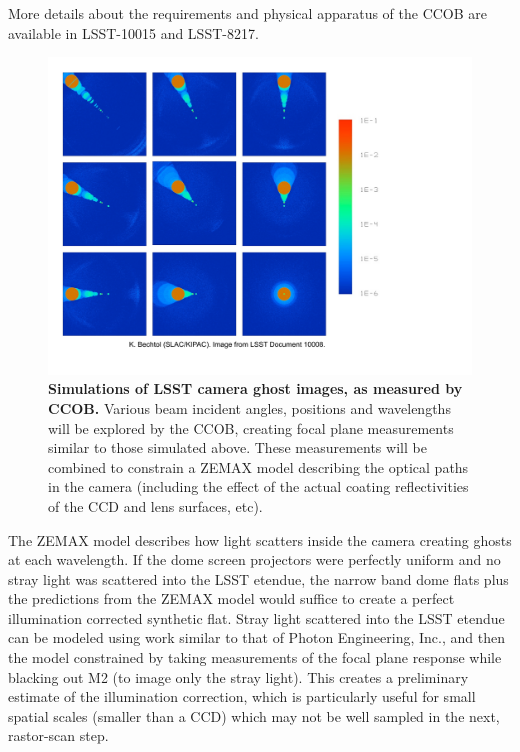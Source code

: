 \documentclass[12pt,preprint]{aastex}
\begin{document}
More details about the requirements and physical apparatus of the CCOB
are available in LSST-10015 and LSST-8217.

\begin{figure}
\centering
\includegraphics[width=5.5in,angle=90]{ghost_images}
\caption{ {\small
{\bf Simulations of LSST camera ghost images, as measured by CCOB. }
Various beam incident angles, positions and wavelengths will be
explored by the CCOB, creating focal plane measurements similar to
those simulated above. These measurements will be combined to
constrain a ZEMAX model describing the optical paths in the camera
(including the effect of the actual coating reflectivities of the CCD
and lens surfaces, etc). }}
\label{fig:ghostimage}
\end{figure}

The ZEMAX model describes how light scatters inside the camera
creating ghosts at each wavelength. If the dome screen projectors were
perfectly uniform and no stray light was scattered into the LSST
etendue, the narrow band dome flats plus the predictions from the
ZEMAX model would suffice to create a perfect illumination corrected
synthetic flat. Stray light scattered into the LSST etendue can be
modeled using work similar to that of Photon Engineering, Inc., and
then the model constrained by taking measurements of the focal plane
response while blacking out M2 (to image only the stray light). This
creates a preliminary estimate of the illumination correction, which
is particularly useful for small spatial scales (smaller than a CCD)
which may not be well sampled in the next, rastor-scan step.
\end{document}
